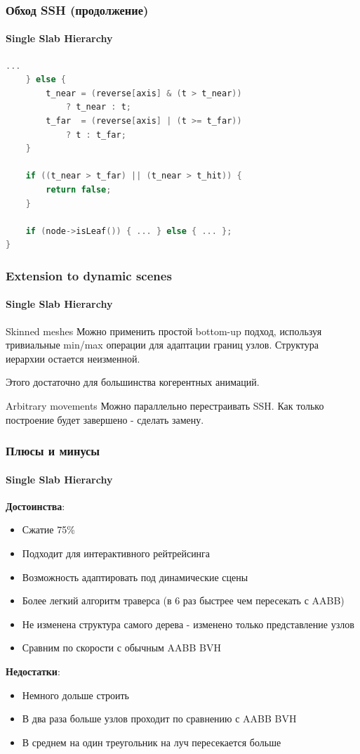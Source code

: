 \documentclass{beamer}
\begin{document}
\begin{frame}[fragile]
    \frametitle{Обход SSH (продолжение)}
    \framesubtitle{Single Slab Hierarchy}

    \begin{lstlisting}[language=C++,basicstyle=\ttfamily,keywordstyle=\color{blue}]
    ...
    } else {
        t_near = (reverse[axis] & (t > t_near))
            ? t_near : t;
        t_far  = (reverse[axis] | (t >= t_far))
            ? t : t_far;
    }

    if ((t_near > t_far) || (t_near > t_hit)) {
        return false;
    }

    if (node->isLeaf()) { ... } else { ... };
}
    \end{lstlisting}
\end{frame}

\begin{frame}
    \frametitle{Extension to dynamic scenes}
    \framesubtitle{Single Slab Hierarchy}
    \begin{block}{Skinned meshes}
        Можно применить простой bottom-up подход,
        используя тривиальные min/max операции для адаптации границ узлов.
        Структура иерархии остается неизменной.

        Этого достаточно для большинства когерентных анимаций.
    \end{block}

    \begin{block}{Arbitrary movements}
        Можно параллельно перестраивать SSH. Как только построение будет завершено - сделать замену.
    \end{block}

\end{frame}

\begin{frame}[t]
    \frametitle{Плюсы и минусы}
    \framesubtitle{Single Slab Hierarchy}
    \textbf{Достоинства}:
    \begin{itemize}
        \item
            Сжатие 75\%
        \item
            Подходит для интерактивного рейтрейсинга
        \item
            Возможность адаптировать под динамические сцены
        \item
            Более легкий алгоритм траверса (в 6 раз быстрее чем пересекать с AABB)
        \item
            Не изменена структура самого дерева - изменено только представление узлов
        \item
            Сравним по скорости с обычным AABB BVH
    \end{itemize}
    \textbf{Недостатки}:
    \begin{itemize}
        \item
            Немного дольше строить
        \item
            В два раза больше узлов проходит по сравнению с AABB BVH
        \item
            В среднем на один треугольник на луч пересекается больше
    \end{itemize}
\end{frame}
\end{document}
